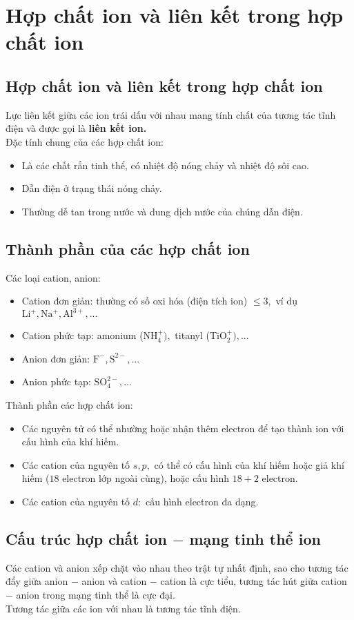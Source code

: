 \section{Hợp chất ion và liên kết trong hợp chất ion}
\subsection{Hợp chất ion và liên kết trong hợp chất ion}
Lực liên kết giữa các ion trái dấu với nhau mang tính chất của tương tác tĩnh điện và được gọi là \textbf{liên kết ion.}\\
Đặc tính chung của các hợp chất ion:
\begin{itemize}
\item Là các chất rắn tinh thể, có nhiệt độ nóng chảy và nhiệt độ sôi cao.
\item Dẫn điện ở trạng thái nóng chảy.
\item Thường dễ tan trong nước và dung dịch nước của chúng dẫn điện.
\end{itemize}
\subsection{Thành phần của các hợp chất ion}
Các loại cation, anion:
\begin{itemize}
\item Cation đơn giản: thường có số oxi hóa (điện tích ion) $\leqslant 3,$ ví dụ $\mathrm{Li ^ +}, \mathrm{Na^+}, \mathrm{Al^{3+}}, ...$
\item Cation phức tạp: amonium ($\mathrm{NH_4^+}),$ titanyl ($\mathrm{TiO_2^+}), ...$
\item Anion đơn giản: $\mathrm{F^-}, \mathrm{S^{2-}}, ...$
\item Anion phức tạp: $\mathrm{SO_4^{2-}}, ...$
\end{itemize}
Thành phần các hợp chất ion:
\begin{itemize}
\item Các nguyên tử có thể nhường hoặc nhận thêm electron để tạo thành ion với cấu hình của khí hiếm.
\item Các cation của nguyên tố $s, p,$ có thể có cấu hình của khí hiếm hoặc giả khí hiếm ($18$ electron lớp ngoài cùng), hoặc cấu hình $18 + 2$ electron.
\item Các cation của nguyên tố $d:$ cấu hình electron đa dạng.
\end{itemize}
\subsection{Cấu trúc hợp chất ion $-$ mạng tinh thể ion}
Các cation và anion xếp chặt vào nhau theo trật tự nhất định, sao cho tương tác đẩy giữa anion $-$ anion và cation $-$ cation là cực tiểu, tương tác hút giữa cation $-$ anion trong mạng tinh thể là cực đại.\\
Tương tác giữa các ion với nhau là tương tác tĩnh điện.

